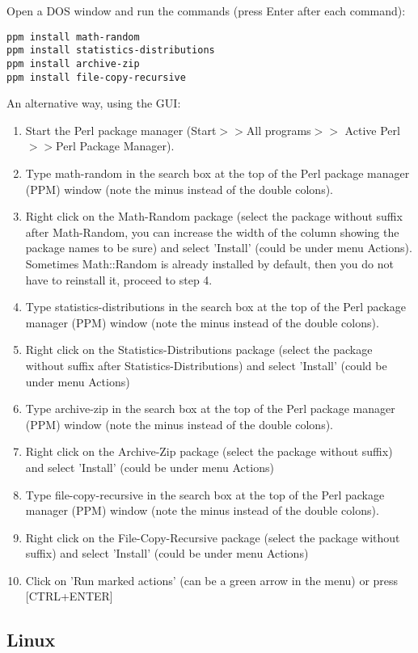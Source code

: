 Open a DOS window and run the commands (press Enter after each command):
\begin{verbatim}
ppm install math-random
ppm install statistics-distributions
ppm install archive-zip
ppm install file-copy-recursive
\end{verbatim}
An alternative way, using the GUI:

\begin{enumerate}
\item Start the Perl package manager (Start$>>$All programs$>>$ Active Perl$>>$Perl Package Manager).
\item Type math-random in the search box at the top of the Perl package manager (PPM) window (note the minus instead of the double colons). 
\item Right click on the Math-Random package (select the package without suffix after Math-Random, you can increase the width of the column showing the package names to be sure) and select 'Install' (could be under menu Actions). Sometimes Math::Random is already installed by default, then you do not have to reinstall it, proceed to step 4.
\item Type statistics-distributions in the search box at the top of the Perl package manager (PPM) window (note the minus instead of the double colons). 
\item Right click on the Statistics-Distributions package (select the package without suffix after Statistics-Distributions) and select 'Install' (could be under menu Actions)
\item Type archive-zip in the search box at the top of the Perl package manager (PPM) window (note the minus instead of the double colons). 
\item Right click on the Archive-Zip package (select the package without suffix) and select 'Install' (could be under menu Actions)
\item Type file-copy-recursive in the search box at the top of the Perl package manager (PPM) window (note the minus instead of the double colons). 
\item Right click on the File-Copy-Recursive package (select the package without suffix) and select 'Install' (could be under menu Actions)
\item Click on 'Run marked actions' (can be a green arrow in the menu) or press [CTRL+ENTER]
\end{enumerate}


\subsection{Linux}

